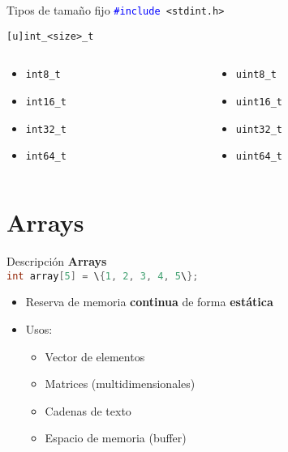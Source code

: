 \documentclass{mybeamer}
\begin{document}
\begin{framesec}{Tipos de tamaño fijo}
	\texttt{\large \textcolor{blue}{\#include} <stdint.h>}
	\\
	\begin{center}
	\texttt{\Large [u]int\_<size>\_t}
	\end{center}

	\begin{columns}[onlytextwidth]
	\begin{column}{0.5\textwidth}
		\begin{itemize}
			\item \texttt{int8\_t}
			\item \texttt{int16\_t}
			\item \texttt{int32\_t}
			\item \texttt{int64\_t}
		\end{itemize}
	\end{column}

	\begin{column}{0.5\textwidth}
		\begin{itemize}
			\item \texttt{uint8\_t}
			\item \texttt{uint16\_t}
			\item \texttt{uint32\_t}
			\item \texttt{uint64\_t}
		\end{itemize}
	\end{column}
	\end{columns}
\end{framesec}

\section{Arrays}
\begin{framesubsec}{Descripción}
	\textbf{\Large Arrays}\\
	\lstinline[language=C]|int array[5] = \{1, 2, 3, 4, 5\};|

	\begin{itemize}
		\item Reserva de memoria \textbf{continua} de forma
			\textbf{estática}
		\item Usos:
		\begin{itemize}
			\item Vector de elementos
			\item Matrices (multidimensionales)
			\item Cadenas de texto
			\item Espacio de memoria (buffer)
		\end{itemize}
	\end{itemize}
\end{framesubsec}
\end{document}
